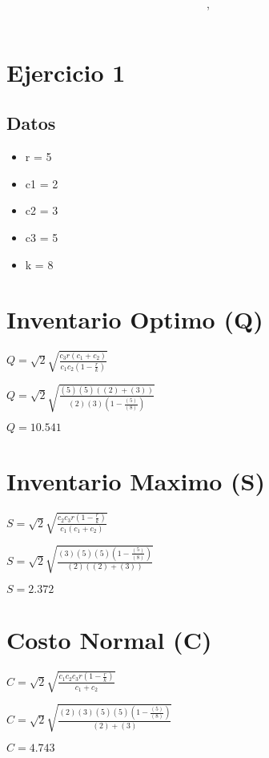 \documentclass{article}
\author{\nombre , \carnet}
\title{\textbf{\Huge\titulo}}
\newcommand*\rbreak{\par\noindent\linebreak}
\begin{document}
%

\maketitle


\section{\Huge Ejercicio 1}
\subsection{\Huge Datos}
\begin{huge}
\begin{itemize}
\item r = 5
\item c1 = 2
\item c2 = 3
\item c3 = 5
\item k = 8
\end{itemize}
\end{huge}\section{\Huge \Huge Inventario Optimo (Q)}
\begin{huge}
$Q = \sqrt{2} \sqrt{\frac{c_{3} r \left(c_{1} + c_{2}\right)}{c_{1} c_{2} \left(1 - \frac{r}{k}\right)}}$\rbreak
$Q = \sqrt{2} \sqrt{\frac{(5)  (5)  \left((2) + (3)\right)}{(2) (3) \left(1 - \frac{ (5) }{ (8) }\right)}}$\rbreak
$Q = 10.541$
\end{huge}
\section{\Huge \Huge Inventario Maximo (S)}
\begin{huge}
$S = \sqrt{2} \sqrt{\frac{c_{2} c_{3} r \left(1 - \frac{r}{k}\right)}{c_{1} \left(c_{1} + c_{2}\right)}}$\rbreak
$S = \sqrt{2} \sqrt{\frac{(3) (5)  (5)  \left(1 - \frac{ (5) }{ (8) }\right)}{(2) \left((2) + (3)\right)}}$\rbreak
$S = 2.372$
\end{huge}
\section{\Huge \Huge Costo Normal (C)}
\begin{huge}
$C = \sqrt{2} \sqrt{\frac{c_{1} c_{2} c_{3} r \left(1 - \frac{r}{k}\right)}{c_{1} + c_{2}}}$\rbreak
$C = \sqrt{2} \sqrt{\frac{(2) (3) (5)  (5)  \left(1 - \frac{ (5) }{ (8) }\right)}{(2) + (3)}}$\rbreak
$C = 4.743$
\end{huge}
\end{document}
